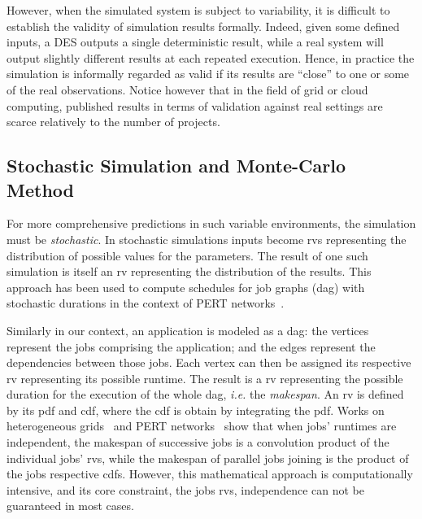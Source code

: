 \documentclass[10pt,conference,compsocconf]{IEEEtran}
\begin{document}
However, when the simulated system is subject to variability, it is difficult to
establish  the  validity of  simulation  results  formally. Indeed,  given  some
defined inputs, a DES outputs a single deterministic result, while a real system
will output  slightly different results  at each repeated execution.   Hence, in
practice  the simulation  is informally  regarded as  valid if  its results  are
``close'' to one or  some of the real observations.  Notice  however that in the
field  of grid  or cloud  computing, published  results in  terms of  validation
against real settings are scarce relatively to the number of projects.


\subsection{Stochastic Simulation and Monte-Carlo Method}

\label{sc:relwork-stochastic}
For  more   comprehensive  predictions  in  such   variable  environments,  the
simulation must  be \emph{stochastic}.  In stochastic simulations  inputs become
\acfp{rv} representing the  distribution of possible values  for the parameters.
The  result  of one  such  simulation  is  itself  an \ac{rv}  representing  the
distribution  of the  results.  This  approach has  been used to  compute
schedules for job graphs (\ac{dag}) with stochastic durations in the context of
PERT networks~\cite{Slyke63}.


Similarly in  our context,  an application is modeled  as a  \ac{dag}: 
the vertices represent the jobs  comprising the application; and the edges represent
the dependencies between those jobs.  Each vertex can then be assigned its respective
\ac{rv}  representing   its  possible  runtime.    The  result  is   a  \ac{rv}
representing  the possible  duration for  the execution  of the  whole \ac{dag},
\textit{i.e.} the \emph{makespan}. An \ac{rv} is  defined by its \ac{pdf}  and \ac{cdf},
where  the   \ac{cdf}  is  obtain   by  integrating  the  \ac{pdf}.    Works  on
heterogeneous  grids~\cite{Li97} and  PERT  networks~\cite{Ludwig01} show  that
when  jobs' runtimes  are  independent, the  makespan of  successive  jobs is  a
convolution product  of the individual  jobs' \acp{rv}, while the  makespan of
parallel jobs joining is the  product of  the jobs respective  \acp{cdf}. However, this
mathematical approach is computationally intensive, and its core constraint,
the jobs \acp{rv}, independence can not be guaranteed in most cases.
\end{document}

